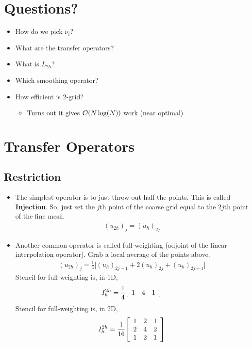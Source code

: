 \documentclass{article}
\begin{document}
    \section{Questions?}
        \begin{itemize}
            \item How do we pick $\nu_i$?
            \item What are the transfer operators?
            \item What is $L_{2h}$?
            \item Which smoothing operator?
            \item How efficient is 2-grid?
            \begin{itemize}
                \item Turns out it gives $\order{N\log(N)}$ work (near optimal)
            \end{itemize}
        \end{itemize}

    \section{Transfer Operators}
        \subsection{Restriction}
            \begin{itemize}
                \item The simplest operator is to just throw out half the points.  This is called \textbf{Injection}.  So, just set the $j$th point of the coarse grid equal to the $2j$th point of the fine mesh.
                \begin{align}
                    (u_{2h})_j = (u_h)_{2j}
                \end{align}
                \item Another common operator is called full-weighting (adjoint of the linear interpolation operator).  Grab a local average of the points above.
                \begin{align}
                    (u_{2h})_j = \frac{1}{4}\big[(u_h)_{2j-1} + 2(u_h)_{2j} + (u_h)_{2j+1}\big]
                \end{align}
                Stencil for full-weighting is, in 1D,
                \begin{align}
                    I_h^{2h} = \frac{1}{4}\qty[\begin{array}{ccc}
                        1 & 4 & 1
                    \end{array}]
                \end{align}
                Stencil for full-weighting is, in 2D,
                \begin{align}
                    I_h^{2h} = \frac{1}{16}\qty[\begin{array}{ccc}
                        1 & 2 & 1 \\
                        2 & 4 & 2 \\
                        1 & 2 & 1
                    \end{array}]
                \end{align}
            \end{itemize}
            
\end{document}

